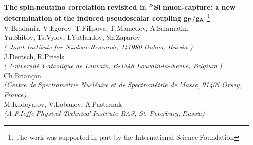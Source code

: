 \topmargin=0cm
\headheight=0cm
\headsep=10mm
\footheight=2.5cm
\hoffset -1cm
\voffset -10mm
\parindent=10mm
\textheight=245mm
\textwidth=165mm

\begin{titlepage}
\begin{center}
            {\Large\bf
The spin-neutrino correlation revisited in $^{28}$Si muon-capture:
                  a new determination of the induced pseudoscalar
coupling ${\bf g_P/g_A}$}
             \footnote{The work was supported in part
             by the International Science Foundation} \\ [1cm]

{\large V.Brudanin, V.Egorov, T.Filipova, T.Mamedov, A.Salamatin, \\
   Yu.Shitov, Ts.Vylov, I.Yutlandov, Sh.Zaparov  \\
 {\normalsize\it  ( Joint Institute for Nuclear Research, 141980 Dubna,
Russia )}\\
           J.Deutsch, R.Prieels \\

 {\normalsize\it ( Universit{\'e} Catholique de Louvain, B-1348
Louvain-la-Neuve, Belgium )}\\
                          Ch.Brian{\c c}on  \\
{\normalsize\it (Centre de Spectrom{\'e}trie Nucl{\'e}aire et de
Spectrom{\'e}trie de Masse, 91405 Orsay, France)} \\ 

                        M.Kudoyarov, V.Lobanov, A.Pasternak \\
{\normalsize\it (A.F.Ioffe Physical Technical Institute RAS,
St.-Peterburg, Russia)}} \\ [1cm]
\end{center}


\begin{abstract}
We describe an improved follow-up of our previous spin-neutrino
correlation experiment, where the 1229 and 2171~keV gamma-rays emitted 
after the $^{28}$Si($\mu ,\nu $)$^{28}$Al(1$^+$, 2202~keV)
reaction were observed
by high-resolution HP Ge detectors at different angles with respect to
the
muon spin\cite{WEIN95,Brudanin95}. In the experiment described
here, a magnetic field
was used both to select events according to the spin-gamma angle and to
measure the
residual muon polarization by $\mu$SR-method.


\end{abstract}
\end{titlepage}

